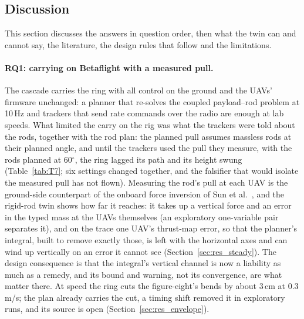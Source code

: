 
\subsection{Discussion}
\label{sec:discussion}

This section discusses the answers in question order, then what the twin can and cannot say, the literature, the
design rules that follow and the limitations.

\paragraph{RQ1: carrying on Betaflight with a measured pull.} The cascade carries the ring with all control on the
ground and the UAVs' firmware unchanged: a planner that re-solves the coupled payload--rod problem at 10\,Hz and
trackers that send rate commands over the radio are enough at lab speeds. What limited the carry on the rig was what
the trackers were told about the rods, together with the rod plan: the planned pull assumes massless rods at their planned
angle, and until the trackers used the pull they measure, with the rods planned at 60$^\circ$, the ring lagged its path
and its height swung (Table~\ref{tab:T7}; six settings changed together, and the falsifier that would isolate the
measured pull has not flown). Measuring the rod's pull at each UAV is the ground-side counterpart of the onboard force inversion
of Sun et al.\ \cite{tudelft}, and the rigid-rod twin shows how far it reaches: it takes up a vertical force and an
error in the typed mass at the UAVs themselves (an exploratory one-variable pair separates it), and on the trace one
UAV's thrust-map error, so that the planner's integral, built to remove exactly those, is left with the horizontal axes
and can wind up vertically on an error it cannot see (Section~\ref{sec:res_steady}). The design consequence is that the integral's vertical channel is now a liability as
much as a remedy, and its bound and warning, not its convergence, are what matter there. At speed the ring cuts the
figure-eight's bends by about 3\,cm at 0.3\,m/s; the plan already carries the cut, a timing shift removed it in
exploratory runs, and its source is open (Section~\ref{sec:res_envelope}).

